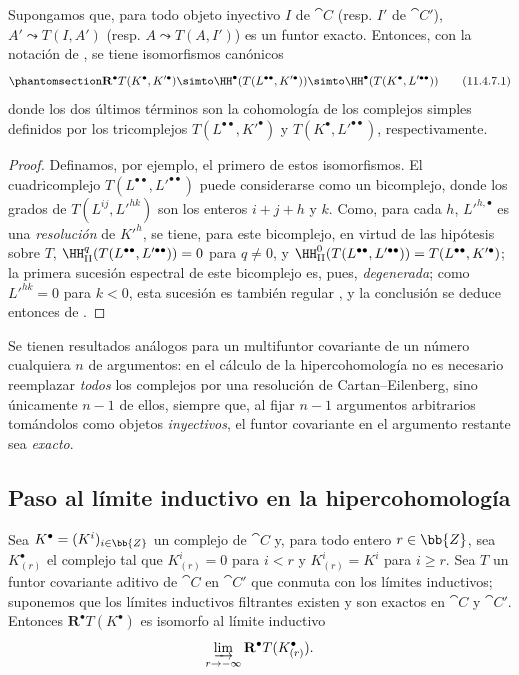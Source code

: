 \documentclass[oneside]{amsart}
\makeatletter
\renewcommand{\geq}{\geqslant}
\newcommand{\ega@arrow}[2]{\mathchoice{#1}{#2}{#2}{#2}}
\renewcommand{\to}{\ega@arrow{\longrightarrow}{\rightarrow}}
\newcommand{\oldpage}[2][]{{\marginnote{\normalfont\textbf{#1}~|~#2}}\ignorespaces}
\let\EGAOriginalLabel\label
\renewcommand{\label}[1]{\phantomsection\EGAOriginalLabel{#1}}
\makeatother
\begin{document}
\begin{proposition}[11.4.7]
\label{0.11.4.7}
Supongamos que, para todo objeto inyectivo $I$ de $\cat{C}$ \textup{(resp.} $I'$ de $\cat{C}'$), $A'\leadsto T(I, A')$ \textup{(resp.} $A\leadsto T(A, I')$) es un funtor exacto.
Entonces, con la notación de \textup{}, se tiene isomorfismos canónicos
\[
  \label{0.11.4.7.1} \mathbf{R}^\bullet T(K^\bullet, K'^\bullet) \simto \HH^\bullet(T(L^{\bullet\bullet}, K'^\bullet)) \simto \HH^\bullet(T(K^\bullet, L'^{\bullet\bullet})) \tag{11.4.7.1} 
\]
donde los dos últimos términos son la cohomología de los complejos simples definidos por los tricomplejos $T(L^{\bullet\bullet}, K'^\bullet)$ y $T(K^\bullet, L'^{\bullet\bullet})$, respectivamente.
\end{proposition}

\begin{proof}
Definamos, por ejemplo, el primero de estos isomorfismos.
El cuadricomplejo $T(L^{\bullet\bullet}, L'^{\bullet\bullet})$ puede considerarse como un bicomplejo, donde los grados de $T(L^{ij}, L'^{hk})$ son los enteros $i+j+h$ y $k$.
Como, para cada $h$, ${L'}^{h,\bullet}$ es una \emph{resolución} de ${K'}^h$, se tiene, para este bicomplejo, en virtud de las hipótesis sobre $T$, $\HH_\mathrm{II}^q(T(L^{\bullet\bullet}, L'^{\bullet\bullet}))=0$ para $q\neq 0$, y $\HH_\mathrm{II}^0(T(L^{\bullet\bullet}, L'^{\bullet\bullet})) = T(L^{\bullet\bullet}, K'^\bullet)$;
la primera sucesión espectral de este bicomplejo es, pues, \emph{degenerada};
como $L'^{hk}=0$ para $k<0$, esta sucesión es también regular , y la conclusión se deduce entonces de .
\end{proof}

Se tienen resultados análogos para un multifuntor covariante de un número cualquiera $n$ de argumentos: en el cálculo de la hipercohomología no es necesario reemplazar \emph{todos} los complejos
por una resolución de Cartan--Eilenberg, sino únicamente $n-1$ de ellos, siempre que, al fijar $n-1$ argumentos arbitrarios tomándolos como objetos \emph{inyectivos}, el funtor covariante en el argumento restante sea \emph{exacto}.


\subsection{Paso al límite inductivo en la hipercohomología}
\label{subsection:0.11.5}

\begin{lemma}[11.5.1]
\label{0.11.5.1}
Sea $K^\bullet=(K^i)_{i\in\bb{Z}}$ un complejo de $\cat{C}$ y, para todo entero $r\in\bb{Z}$, sea $K^\bullet_{(r)}$ el complejo tal que $K^i_{(r)}=0$ para $i<r$ y $K^i_{(r)}=K^i$ para $i\geq r$.
Sea $T$ un funtor covariante aditivo
\oldpage[0\textsubscript{III}]{36}
de $\cat{C}$ en $\cat{C}'$ que conmuta con los límites inductivos; suponemos que los límites inductivos filtrantes existen y son exactos en $\cat{C}$ y $\cat{C}'$.
Entonces $\mathbf{R}^\bullet T(K^\bullet)$ es isomorfo al límite inductivo
\[
  \varinjlim_{r\to-\infty}\mathbf{R}^\bullet T(K^\bullet_{(r)}).
\]
\end{lemma}
\end{document}
